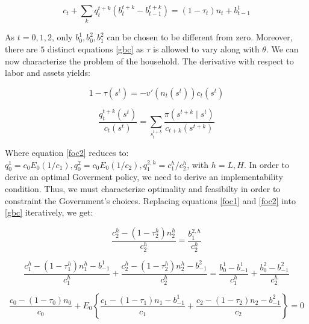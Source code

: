 \documentclass[11pt,letterpaper]{article}
\let\oldsum\sum
\renewcommand{\sum}{\displaystyle\oldsum} %
\begin{document}
\bigskip

\begin{equation}
\label{gbc}
c_t+\sum_k q_t^{t+k}(b_t^{t+k}-b_{t-1}^{t+k})=(1-\tau_t)n_t+b_{t-1}^{t}
\end{equation}

\bigskip

As $t=0,1,2$, only $b_0^{1},b_0^{2},b_1^{2}$ can be chosen to be different from zero. Moreover, there are $5$ distinct equations \eqref{gbc} as $\tau$ is allowed to vary along with $\theta$. We can now characterize the problem of the household. The derivative with respect to labor and assets yields:

\bigskip

\begin{equation}
\label{foc1}
1-\tau(s^t)=-v'(n_t(s^t))c_t(s^t)
\end{equation}

\begin{equation}
\label{foc2}
\frac{q_t^{t+k}(s^t)}{c_t(s^t)}= \sum_{s^{t+k}_t}\frac{\pi\left(s^{t+k}\mid s^{t}  \right)}{c_{t+k}(s^{t+k})}
\end{equation}

\bigskip

Where equation \eqref{foc2} reduces to: $q_0^1=c_0E_0(1/c_1),q_0^2=c_0E_0(1/c_2),q_1^{2,h}=c^{h}_1/c^{h}_2$, with $h=L,H$. In order to derive an optimal Goverment policy, we need to derive an implementability condition. Thus, we must characterize optimality and feasibilty in order to constraint the Government's choices. Replacing equations \eqref{foc1} and \eqref{foc2} into \eqref{gbc} iteratively, we get:

\bigskip

\begin{equation}
\label{ic2}
\frac{c^{h}_2-(1-\tau_2^{h})n_2^{h}}{c^{h}_2}=\frac{b^{2,h}_1}{c^{h}_2}
\end{equation}

\begin{equation}
\label{ic1}
\frac{c^{h}_1-(1-\tau_1^{h})n_1^{h}-b^1_{-1}}{c^{h}_1}+\frac{c^{h}_2-(1-\tau_2^{h})n_2^{h}-b^2_{-1}}{c^{h}_2}=\frac{b^{1}_0-b^1_{-1}}{c^{h}_1}+\frac{b^{2}_0-b^2_{-1}}{c^{h}_2}
\end{equation}

\begin{equation}
\label{ic0}
\frac{c_0-(1-\tau_0)n_0}{c_0}+E_0\left\{ \frac{c_1-(1-\tau_1)n_1-b^1_{-1}}{c_1}+\frac{c_2-(1-\tau_2)n_2-b^2_{-1}}{c_2} \right\}=0
\end{equation}
\end{document}
